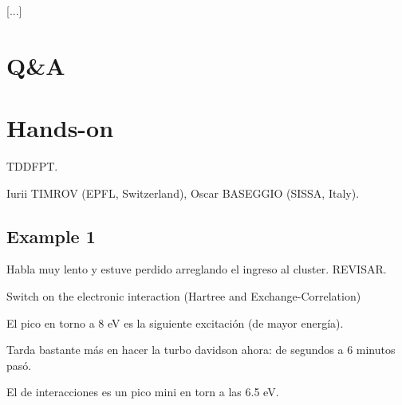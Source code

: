   [...]

\section{Q\&A}

\section{Hands-on}

   TDDFPT.

  	Iurii TIMROV (EPFL, Switzerland), Oscar BASEGGIO (SISSA, Italy).

\subsection{Example 1}

  Habla muy lento y estuve perdido arreglando el ingreso al cluster. REVISAR.

  Switch on the electronic interaction (Hartree and Exchange-Correlation)

  El pico en torno a 8 eV es la siguiente excitación (de mayor energía).

  Tarda bastante más en hacer la turbo davidson ahora: de segundos a 6 minutos pasó.

  El de interacciones es un pico mini en torn a las 6.5 eV.

